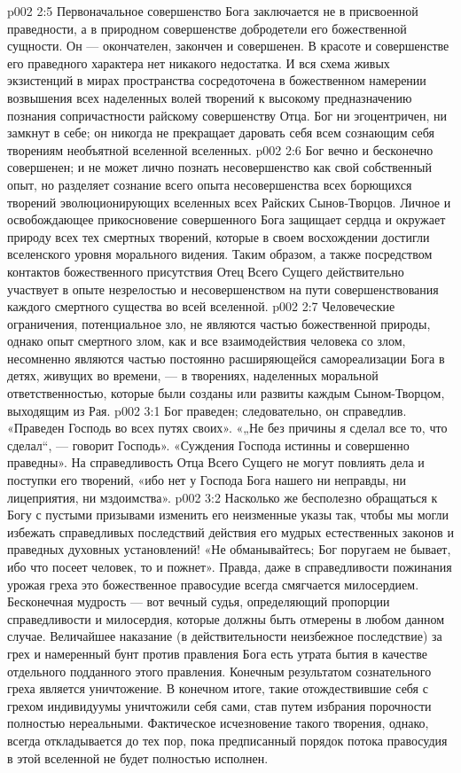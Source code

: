 \vs p002 2:5 \pc Первоначальное совершенство Бога заключается не в присвоенной праведности, а в природном совершенстве добродетели его божественной сущности. Он --- окончателен, закончен и совершенен. В красоте и совершенстве его праведного характера нет никакого недостатка. И вся схема живых экзистенций в мирах пространства сосредоточена в божественном намерении возвышения всех наделенных волей творений к высокому предназначению познания сопричастности райскому совершенству Отца. Бог ни эгоцентричен, ни замкнут в себе; он никогда не прекращает даровать себя всем сознающим себя творениям необъятной вселенной вселенных.
\vs p002 2:6 Бог вечно и бесконечно совершенен; и не может лично познать несовершенство как свой собственный опыт, но разделяет сознание всего опыта несовершенства всех борющихся творений эволюционирующих вселенных всех Райских Сынов\hyp{}Творцов. Личное и освобождающее прикосновение совершенного Бога защищает сердца и окружает природу всех тех смертных творений, которые в своем восхождении достигли вселенского уровня морального видения. Таким образом, а также посредством контактов божественного присутствия Отец Всего Сущего действительно участвует в опыте  незрелостью и несовершенством на пути совершенствования каждого смертного существа во всей вселенной.
\vs p002 2:7 Человеческие ограничения, потенциальное зло, не являются частью божественной природы, однако опыт смертного  злом, как и все взаимодействия человека со злом, несомненно являются частью постоянно расширяющейся самореализации Бога в детях, живущих во времени, --- в творениях, наделенных моральной ответственностью, которые были созданы или развиты каждым Сыном\hyp{}Творцом, выходящим из Рая.
\vs p002 3:1 Бог праведен; следовательно, он справедлив. «Праведен Господь во всех путях своих». «„Не без причины я сделал все то, что сделал“, --- говорит Господь». «Суждения Господа истинны и совершенно праведны». На справедливость Отца Всего Сущего не могут повлиять дела и поступки его творений, «ибо нет у Господа Бога нашего ни неправды, ни лицеприятия, ни мздоимства».
\vs p002 3:2 \pc Насколько же бесполезно обращаться к Богу с пустыми призывами изменить его неизменные указы так, чтобы мы могли избежать справедливых последствий действия его мудрых естественных законов и праведных духовных установлений! «Не обманывайтесь; Бог поругаем не бывает, ибо что посеет человек, то и пожнет». Правда, даже в справедливости пожинания урожая греха это божественное правосудие всегда смягчается милосердием. Бесконечная мудрость --- вот вечный судья, определяющий пропорции справедливости и милосердия, которые должны быть отмерены в любом данном случае. Величайшее наказание (в действительности неизбежное последствие) за грех и намеренный бунт против правления Бога есть утрата бытия в качестве отдельного подданного этого правления. Конечным результатом сознательного греха является уничтожение. В конечном итоге, такие отождествившие себя с грехом индивидуумы уничтожили себя сами, став путем избрания порочности полностью нереальными. Фактическое исчезновение такого творения, однако, всегда откладывается до тех пор, пока предписанный порядок потока правосудия в этой вселенной не будет полностью исполнен.
